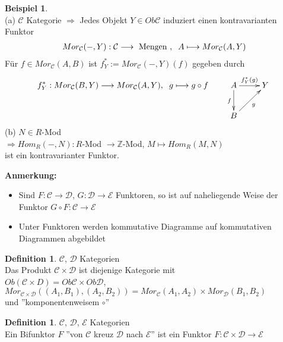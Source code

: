 \documentclass[10pt,a4paper,numbers=endperiod]{scrreprt}
\theoremstyle{definition}
\newtheorem{defi}[satz]{Definition}
\newtheorem{bsp}[satz]{Beispiel}
\def\ZZ{{\mathbb Z}}
\begin{document}
\begin{bsp}
	$ $\\
	(a) $\mathcal{C}$ Kategorie $\Rightarrow$ Jedes Objekt $Y \in Ob \mathcal{C}$ induziert einen kontravarianten Funktor \begin{align*}
	Mor_{\mathcal{C}} (-, Y): \mathcal{C} \longrightarrow \text{ Mengen }, \hspace*{2mm} A \longmapsto Mor_{\mathcal{C}} (A, Y)
	\end{align*}
	Für $f \in Mor_{\mathcal{C}}(A, B)$ ist $f_Y^* := Mor_{\mathcal{C}}(-, Y)(f)$ gegeben durch \begin{align*}
		f_Y^*: Mor_{\mathcal{C}} (B, Y) \longrightarrow Mor_{\mathcal{C}} (A, Y), \hspace*{2mm} g \longmapsto g \circ f \hspace*{7mm} \begin{xy}
		\xymatrix{
			A \ar[r]^{f_Y^*(g)} \ar[d]_f   &   Y\\
			B \ar[ur]_g &
		}
		\end{xy}
	\end{align*}
	(b) $N \in R$-Mod\\
	$\Rightarrow Hom_R(-, N): R$-Mod $\rightarrow \ZZ$-Mod, $M \mapsto Hom_R(M, N)$\\
	ist ein kontravarianter Funktor.
\end{bsp}

\textbf{Anmerkung:} \begin{itemize}
	\item Sind $F: \mathcal{C} \rightarrow \mathcal{D}$, $G: \mathcal{D} \rightarrow \mathcal{E}$ Funktoren, so ist auf naheliegende Weise der Funktor $G \circ F: \mathcal{C} \longrightarrow \mathcal{E}$
	\item Unter Funktoren werden kommutative Diagramme auf kommutativen Diagrammen abgebildet
\end{itemize}

\begin{defi}
	$\mathcal{C}$, $\mathcal{D}$ Kategorien\\
	Das Produkt $\mathcal{C} \times \mathcal{D}$ ist diejenige Kategorie mit\\ $Ob(\mathcal{C} \times D) = Ob \mathcal{C} \times Ob \mathcal{D}$, $Mor_{\mathcal{C} \times \mathcal{D}} ((A_1, B_1), (A_2, B_2)) = Mor_{\mathcal{C}} (A_1, A_2) \times Mor_{\mathcal{D}} (B_1, B_2)$\\
	und ''komponentenweisem $\circ$''
\end{defi}

\begin{defi}
	$\mathcal{C}$, $\mathcal{D}$, $\mathcal{E}$ Kategorien\\
	Ein Bifunktor $F$ ''von $\mathcal{C}$ kreuz $\mathcal{D}$ nach $\mathcal{E}$'' ist ein Funktor $F: \mathcal{C} \times \mathcal{D} \rightarrow \mathcal{E}$
\end{defi}
\end{document}
